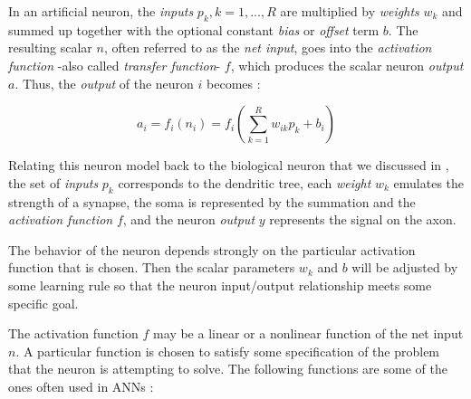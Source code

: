 In an artificial neuron, the \emph{inputs} $p_{k}, k=1,...,R$ are
multiplied by \emph{weights} $w_{k}$ and summed up together with the
optional constant \emph{bias} or \emph{offset} term $b$. The resulting
scalar $n$, often referred to as the \emph{net input}, goes into
the \emph{activation function} -also called \emph{transfer function}-
$f$, which produces the scalar neuron \emph{output} $a$.  Thus,
the \emph{output} of the neuron $i$
becomes \cite{Demuth:2014:NND:2721661}:

\begin{equation}
a_{i}=f_{i}(n_{i})=f_{i}(\sum_{k=1}^R w_{ik}p_{k}+b_{i})
\label{eq:expandedgeneralneuroneq}
\end{equation}

Relating this neuron model back to the biological neuron that we
discussed in , the set of \emph{inputs} $p_{k}$
corresponds to the dendritic tree, each \emph{weight} $w_{k}$ emulates
the strength of a synapse, the soma is represented by the summation
and the \emph{activation function} $f$, and the neuron \emph{output}
$y$ represents the signal on the axon.

The behavior of the neuron depends strongly on the particular
activation function that is chosen. Then the scalar parameters $w_{k}$
and $b$ will be adjusted by some learning rule so that the neuron
input/output relationship meets some specific goal.

The activation function $f$ may be a linear or a nonlinear function of
the net input $n$.  A particular function is chosen to satisfy some
specification of the problem that the neuron is attempting to
solve. The following functions are some of the ones often used in
ANNs \cite{Demuth:2014:NND:2721661}:

